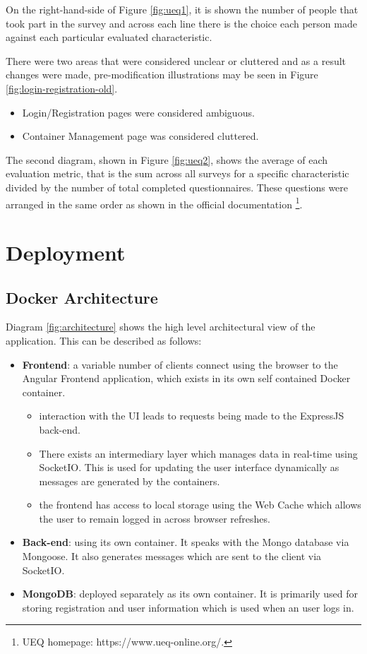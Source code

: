 \documentclass[multi, tikz, a4paper, oneside]{article}
\begin{document}
On the right-hand-side of Figure \ref{fig:ueq1}, it is shown the number of
people that took part in the survey and across each line there is the choice
each person made against each particular evaluated characteristic.


There were two areas that were considered unclear or cluttered and as a result
changes were made, pre-modification illustrations may be seen in Figure
\ref{fig:login-registration-old}.
\begin{itemize}
  \item Login/Registration pages were considered ambiguous.
  \item Container Management page was considered cluttered.
\end{itemize}

The second diagram, shown in Figure \ref{fig:ueq2}, shows the average of each
evaluation metric, that is the sum across all surveys for a specific 
characteristic divided by the number of total completed questionnaires. These
questions were arranged in the same order as shown in the official
documentation \footnote{UEQ homepage: https://www.ueq-online.org/.}.


\section{Deployment}
\subsection{Docker Architecture}
Diagram \ref{fig:architecture} shows the high level architectural view of the
application. This can be described as follows:
\begin{itemize}
\item \textbf{Frontend}: a variable number of clients connect using the browser
  to the Angular Frontend application, which exists in its own self contained
  Docker container.
  \begin{itemize}
  \item interaction with the UI leads to requests being made to the ExpressJS
    back-end.
  \item There exists an intermediary layer which manages data in real-time using
    SocketIO. This is used for updating the user interface dynamically as
    messages are generated by the containers.
  \item the frontend has access to local storage using the Web Cache which
    allows the user to remain logged in across browser refreshes.
  \end{itemize}
\item \textbf{Back-end}: using its own container. It speaks with the Mongo
  database via Mongoose. It also generates messages which are sent to the client
  via SocketIO.
\item \textbf{MongoDB}: deployed separately as its own container. It is
  primarily used for storing registration and user information which is used
  when an user logs in.
\end{itemize}
\end{document}
